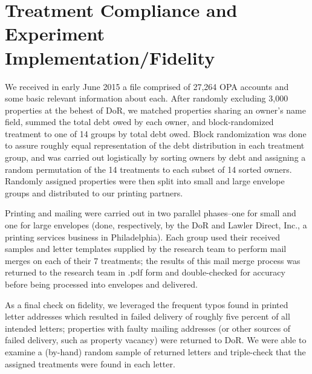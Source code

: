 

\part*{Treatment Compliance and Experiment Implementation/Fidelity}

We received in early June 2015 a file comprised of 27,264 OPA accounts
and some basic relevant information about each. After randomly excluding
3,000 properties at the behest of DoR, we matched properties sharing
an owner's name field, summed the total debt owed by each owner, and
block-randomized treatment to one of 14 groups by total debt owed.
Block randomization was done to assure roughly equal representation
of the debt distribution in each treatment group, and was carried
out logistically by sorting owners by debt and assigning a random
permutation of the 14 treatments to each subset of 14 sorted owners.
Randomly assigned properties were then split into small and large
envelope groups and distributed to our printing partners.

Printing and mailing were carried out in two parallel phases--one
for small and one for large envelopes (done, respectively, by the
DoR and Lawler Direct, Inc., a printing services business in Philadelphia).
Each group used their received samples and letter templates supplied
by the research team to perform mail merges on each of their 7 treatments;
the results of this mail merge process was returned to the research
team in .pdf form and double-checked for accuracy before being processed
into envelopes and delivered.

As a final check on fidelity, we leveraged the frequent typos found
in printed letter addresses which resulted in failed delivery of roughly
five percent of all intended letters; properties with faulty mailing
addresses (or other sources of failed delivery, such as property vacancy)
were returned to DoR. We were able to examine a (by-hand) random sample
of returned letters and triple-check that the assigned treatments
were found in each letter.
